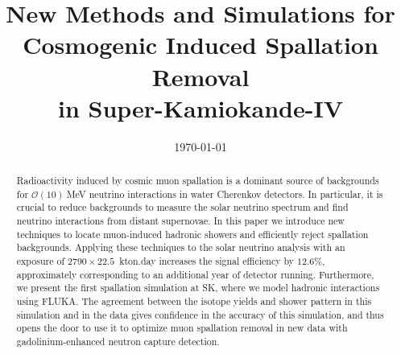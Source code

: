 \documentclass[%
 reprint,
superscriptaddress,
 amsmath,amssymb,
 aps,
]{revtex4-2}
\begin{document}
\title{New Methods and Simulations for Cosmogenic Induced Spallation Removal \\ in Super-Kamiokande-IV}%



\date{\today}%

\begin{abstract}
Radioactivity induced by cosmic muon spallation is a dominant source of backgrounds for $\mathcal{O}(10)~$MeV neutrino interactions in water Cherenkov detectors. In particular, it is crucial to reduce backgrounds to measure the solar neutrino spectrum and find neutrino interactions from distant supernovae. In this paper we introduce new techniques to locate muon-induced hadronic showers and efficiently reject spallation backgrounds. 
Applying these techniques to the solar neutrino analysis with an exposure of $2790\times22.5$~kton.day increases the signal efficiency by $12.6\%$, approximately corresponding to an additional year of detector running.
Furthermore, we present the first spallation simulation at SK, where we model hadronic interactions using FLUKA. The agreement between the isotope yields and shower pattern in this simulation and in the data gives confidence in the accuracy of this simulation, and thus opens the door to use it to optimize muon spallation removal in new data with gadolinium-enhanced neutron capture detection. 
\end{abstract}

\maketitle
\end{document}
